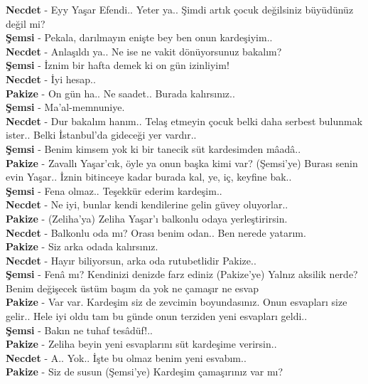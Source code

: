 \documentclass[]{book}
\begin{document}
\textbf{Necdet} - Eyy Yaşar Efendi.. Yeter ya.. Şimdi artık çocuk değilsiniz büyüdünüz değil mi?\\
\textbf{Şemsi} - Pekala, darılmayın enişte bey ben onun kardeşiyim..\\
\textbf{Necdet} - Anlaşıldı ya.. Ne ise ne vakit dönüyorsunuz bakalım?\\
\textbf{Şemsi} - İznim bir hafta demek ki on gün izinliyim!\\
\textbf{Necdet} - İyi hesap..\\
\textbf{Pakize} - On gün ha.. Ne saadet.. Burada kalırsınız..\\
\textbf{Şemsi} - Ma'al-memnuniye.\\
\textbf{Necdet} - Dur bakalım hanım.. Telaş etmeyin çocuk belki daha serbest bulunmak ister.. Belki İstanbul'da gideceği yer vardır..\\
\textbf{Şemsi} - Benim kimsem yok ki bir tanecik süt kardesimden mâadâ..\\
\textbf{Pakize} - Zavallı Yaşar'cık, öyle ya onun başka kimi var? (Şemsi'ye) Burası senin evin Yaşar.. İznin bitinceye kadar burada kal, ye, iç, keyfine bak..\\
\textbf{Şemsi} - Fena olmaz.. Teşekkür ederim kardeşim..\\
\textbf{Necdet} - Ne iyi, bunlar kendi kendilerine gelin güvey oluyorlar..\\
\textbf{Pakize} - (Zeliha'ya) Zeliha Yaşar'ı balkonlu odaya yerleştirirsin.\\
\textbf{Necdet} - Balkonlu oda mı? Orası benim odan.. Ben nerede yatarım.\\
\textbf{Pakize} - Siz arka odada kalırsınız.\\
\textbf{Necdet} - Hayır biliyorsun, arka oda rutubetlidir Pakize..\\
\textbf{Şemsi} - Fenâ mı? Kendinizi denizde farz ediniz (Pakize'ye) Yalnız aksilik nerde? Benim değişecek üstüm başım da yok ne çamaşır ne esvap\\
\textbf{Pakize} - Var var. Kardeşim siz de zevcimin boyundasınız. Onun esvapları size gelir.. Hele iyi oldu tam bu günde onun terziden yeni esvapları geldi..\\
\textbf{Şemsi} - Bakın ne tuhaf tesâdüf!..\\
\textbf{Pakize} - Zeliha beyin yeni esvaplarını süt kardeşime verirsin..\\
\textbf{Necdet} - A.. Yok.. İşte bu olmaz benim yeni esvabım..\\
\textbf{Pakize} - Siz de susun (Şemsi'ye) Kardeşim çamaşırınız var mı?\\
\end{document}
